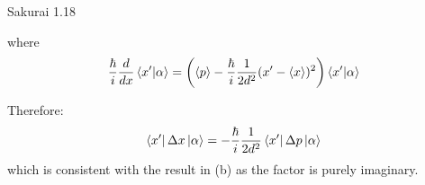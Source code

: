 \documentclass{article}
\begin{document}
\begin{section}{Sakurai 1.18}
\begin{enumerate}
\begin{tcolorbox}
				where
				\begin{align*}
					\frac{\hbar}{i} \frac{d}{dx} \braket{x'}{\alpha} =
					\left(\left<p\right> - \frac{\hbar}{i} \frac{1}{2d^2} (x' - \left<x\right>)^2\right) \braket{x'}{\alpha} \\
				\end{align*}

				Therefore:
				\begin{align*}
					\bra{x'}\Delta x\ket{\alpha} = - \frac{\hbar}{i} \frac{1}{2d^2} \bra{x'}\Delta p\ket{\alpha}
				\end{align*}
				which is consistent with the result in (b) as the factor is purely imaginary.
			\end{tcolorbox}
	\end{enumerate}


\end{section}
\end{document}
